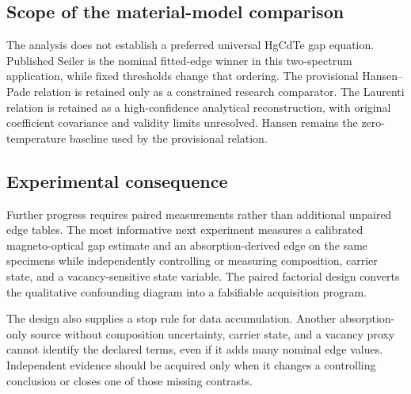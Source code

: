 \subsection{Scope of the material-model comparison}

The analysis does not establish a preferred universal HgCdTe gap equation. Published Seiler is the nominal fitted-edge winner in this two-spectrum application, while fixed thresholds change that ordering. The provisional Hansen--Pade relation is retained only as a constrained research comparator. The Laurenti relation is retained as a high-confidence analytical reconstruction, with original coefficient covariance and validity limits unresolved. Hansen remains the zero-temperature baseline used by the provisional relation.

\subsection{Experimental consequence}

Further progress requires paired measurements rather than additional unpaired edge tables. The most informative next experiment measures a calibrated magneto-optical gap estimate and an absorption-derived edge on the same specimens while independently controlling or measuring composition, carrier state, and a vacancy-sensitive state variable. The paired factorial design converts the qualitative confounding diagram into a falsifiable acquisition program.

The design also supplies a stop rule for data accumulation. Another absorption-only source without composition uncertainty, carrier state, and a vacancy proxy cannot identify the declared terms, even if it adds many nominal edge values. Independent evidence should be acquired only when it changes a controlling conclusion or closes one of those missing contrasts.